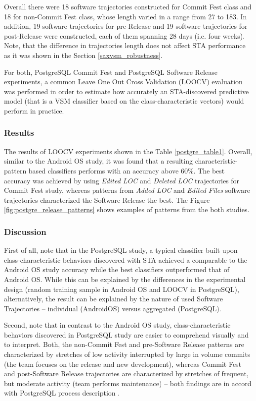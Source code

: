 Overall there were 18 software trajectories constructed for Commit Fest class and 18 for non-Commit Fest class, whose length varied in a range from 27 to 183. In addition, 19 software trajectories for pre-Release and 19 software trajectories for post-Release were constructed, each of them spanning 28 days (i.e. four weeks). Note, that the difference in trajectories length does not affect STA performance as it was shown in the Section \ref{saxvsm_robustness}.

For both, PostgreSQL Commit Fest and PostgreSQL Software Release experiments, a common Leave One Out Cross Validation (LOOCV) \cite{citeulike:11275990} evaluation was performed in order to estimate how accurately an STA-discovered predictive model (that is a VSM classifier based on the class-characteristic vectors) would perform in practice.

\subsubsection{Results}
The results of LOOCV experiments shown in the Table \ref{postgre_table1}. Overall, similar to the Android OS study, it was found that a resulting characteristic-pattern based classifiers performs with an accuracy above 60\%. The best accuracy was achieved by using \textit{Edited LOC} and \textit{Deleted LOC} trajectories for Commit Fest study, whereas patterns from \textit{Added LOC} and \textit{Edited Files} software trajectories characterized the Software Release the best. The Figure \ref{fig:postgre_release_patterns} shows examples of patterns from the both studies.

\subsubsection{Discussion}
First of all, note that in the PostgreSQL study, a typical classifier built upon class-characteristic behaviors discovered with STA achieved a comparable to the Android OS study accuracy while the best classifiers outperformed that of Android OS. While this can be explained by the differences in the  experimental design (random training sample in Android OS and LOOCV in PostgreSQL), alternatively, the result can be explained by the nature of used Software Trajectories -- individual (AndroidOS) versus aggregated (PostgreSQL).

Second, note that in contrast to the Android OS study, class-characteristic behaviors discovered in PostgreSQL study are easier to comprehend visually and to interpret. Both, the non-Commit Fest and pre-Software Release patterns are characterized by stretches of low activity interrupted by large in volume commits (the team focuses on the release and new development), whereas Commit Fest and post-Software Release trajectories are characterized by stretches of frequent, but moderate activity (team performs maintenance) -- both findings are in accord with PostgreSQL process description \cite{commit-fest}.
\clearpage

